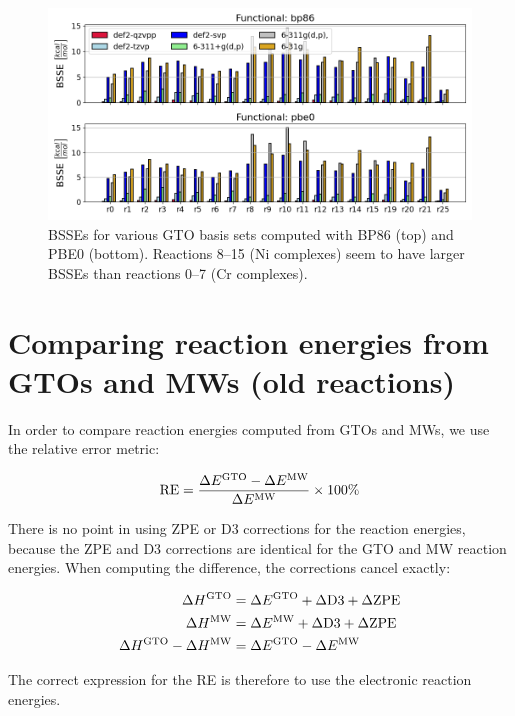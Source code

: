 \documentclass[11pt,a4paper]{article}
\begin{document}
\begin{figure}[H]
	\centering
	\includegraphics[width = \textwidth]{../figs/bsse.png}
	\caption{BSSEs for various GTO basis sets computed with BP86 (top) and PBE0 (bottom). Reactions 8--15 (Ni complexes) seem to have larger BSSEs than reactions 0--7 (Cr complexes).}
	\label{fig: bsse overview}
\end{figure}

\section{Comparing reaction energies from GTOs and MWs (old reactions)}
In order to compare reaction energies computed from GTOs and MWs, we use the relative error metric:

\begin{equation} \label{eq: relative error}
\text{RE} = \frac{\Delta E^{\small\text{GTO}} - \Delta E^{\small\text{MW}}}{\Delta E^{\small\text{MW}}} \times 100\%
\end{equation}

There is no point in using ZPE or D3 corrections for the reaction energies, because the ZPE and D3 corrections are identical for the GTO and MW reaction energies.
When computing the difference, the corrections cancel exactly:

\begin{align} \label{eq: }
 \Delta H^{\small\text{GTO}} &= \Delta E^{\small\text{GTO}} + \Delta \text{D3} + \Delta \text{ZPE} \\
  \Delta H^{\small\text{MW}} &= \Delta E^{\small\text{MW}} + \Delta \text{D3} + \Delta \text{ZPE} \\
  \Delta H^{\small\text{GTO}} - \Delta H^{\small\text{MW}} &= \Delta E^{\small\text{GTO}} - \Delta E^{\small\text{MW}}
\end{align}

The correct expression for the RE is therefore to use the electronic reaction energies.
\end{document}
